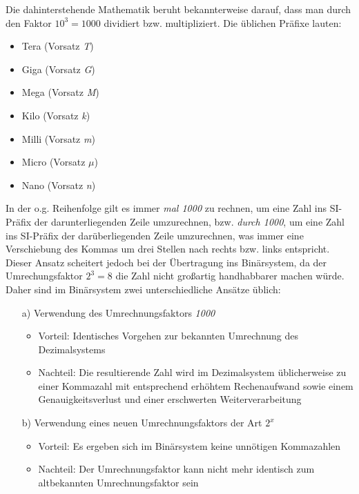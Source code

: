 \documentclass[a4paper, 12pt]{report}
\begin{document}
Die dahinterstehende Mathematik beruht bekannterweise darauf, dass man durch
den Faktor $10^3 = 1000$ dividiert bzw. multipliziert. Die üblichen Präfixe
lauten:

\begin{itemize}
    \item Tera (Vorsatz \emph{T})
    \item Giga (Vorsatz \emph{G})
    \item Mega (Vorsatz \emph{M})
    \item Kilo (Vorsatz \emph{k})
    \item Milli (Vorsatz \emph{m})
    \item Micro (Vorsatz \emph{$\mu$})
    \item Nano (Vorsatz \emph{n})
\end{itemize}

In der o.g. Reihenfolge gilt es immer \emph{\glqq mal 1000\grqq{}} zu rechnen,
um eine Zahl ins SI-Präfix der darunterliegenden Zeile umzurechnen, bzw.
\emph{\glqq durch 1000\grqq{}}, um eine Zahl ins SI-Präfix der darüberliegenden
Zeile umzurechnen, was immer eine Verschiebung des Kommas um drei Stellen nach
rechts bzw. links entspricht. \\

Dieser Ansatz scheitert jedoch bei der Übertragung ins Binärsystem, da der
Umrechungsfaktor \emph{$2^3 = 8$} die Zahl nicht großartig handhabbarer machen
würde. Daher sind im Binärsystem zwei unterschiedliche Ansätze üblich:

\begin{itemize}
    \item[a)] Verwendung des Umrechnungsfaktors \emph{1000}
	\begin{itemize}
	    \item Vorteil: Identisches Vorgehen zur bekannten Umrechnung des
		Dezimalsystems
	    \item Nachteil: Die resultierende Zahl wird im Dezimalsystem
		üblicherweise zu einer Kommazahl mit entsprechend erhöhtem
		Rechenaufwand sowie einem Genauigkeitsverlust und einer
		erschwerten Weiterverarbeitung
	\end{itemize}
    \item[b)] Verwendung eines neuen Umrechnungsfaktors der Art $2^x$
	\begin{itemize}
	    \item Vorteil: Es ergeben sich im Binärsystem keine unnötigen
		Kommazahlen
	    \item Nachteil: Der Umrechnungsfaktor kann nicht mehr identisch zum
		altbekannten Umrechnungsfaktor sein
	\end{itemize}
\end{itemize}
\end{document}

